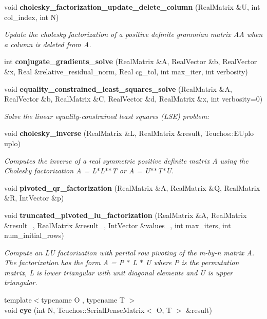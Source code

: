 \begin{DoxyCompactItemize}
void {\bfseries cholesky\+\_\+factorization\+\_\+update\+\_\+delete\+\_\+column} (Real\+Matrix \&U, int col\+\_\+index, int N)
\begin{DoxyCompactList}\small\item\em Update the cholesky factorization of a positive definite grammian matrix A\textquotesingle{}A when a column is deleted from A. \end{DoxyCompactList}\item 
int {\bfseries conjugate\+\_\+gradients\+\_\+solve} (Real\+Matrix \&A, Real\+Vector \&b, Real\+Vector \&x, Real \&relative\+\_\+residual\+\_\+norm, Real cg\+\_\+tol, int max\+\_\+iter, int verbosity)
\item 
void {\bfseries equality\+\_\+constrained\+\_\+least\+\_\+squares\+\_\+solve} (Real\+Matrix \&A, Real\+Vector \&b, Real\+Matrix \&C, Real\+Vector \&d, Real\+Matrix \&x, int verbosity=0)
\begin{DoxyCompactList}\small\item\em Solve the linear equality-\/constrained least squares (L\+SE) problem\+: \end{DoxyCompactList}\item 
void {\bfseries cholesky\+\_\+inverse} (Real\+Matrix \&L, Real\+Matrix \&result, Teuchos\+::\+E\+Uplo uplo)
\begin{DoxyCompactList}\small\item\em Computes the inverse of a real symmetric positive definite matrix A using the Cholesky factorization A = L$\ast$\+L$\ast$$\ast$T or A = U$\ast$$\ast$\+T$\ast$U. \end{DoxyCompactList}\item 
void {\bfseries pivoted\+\_\+qr\+\_\+factorization} (Real\+Matrix \&A, Real\+Matrix \&Q, Real\+Matrix \&R, Int\+Vector \&p)\label{LinearAlgebra_8cpp_a416f5a24243db5ebf383c64e8e40a74a}

\item 
void {\bfseries truncated\+\_\+pivoted\+\_\+lu\+\_\+factorization} (Real\+Matrix \&A, Real\+Matrix \&result\+\_, Real\+Matrix \&result\+\_, Int\+Vector \&values\+\_, int max\+\_\+iters, int num\+\_\+initial\+\_\+rows)
\begin{DoxyCompactList}\small\item\em Compute an LU factorization with parital row pivoting of the m-\/by-\/n matrix A. The factorization has the form A = P $\ast$ L $\ast$ U where P is the permutation matrix, L is lower triangular with unit diagonal elements and U is upper triangular. \end{DoxyCompactList}\item 
{\footnotesize template$<$typename O , typename T $>$ }\\void {\bfseries eye} (int N, Teuchos\+::\+Serial\+Dense\+Matrix$<$ O, T $>$ \&result)\label{LinearAlgebra_8hpp_aed1ac3db9100a5f351b976fe3e36b45c}


\end{DoxyCompactItemize}
